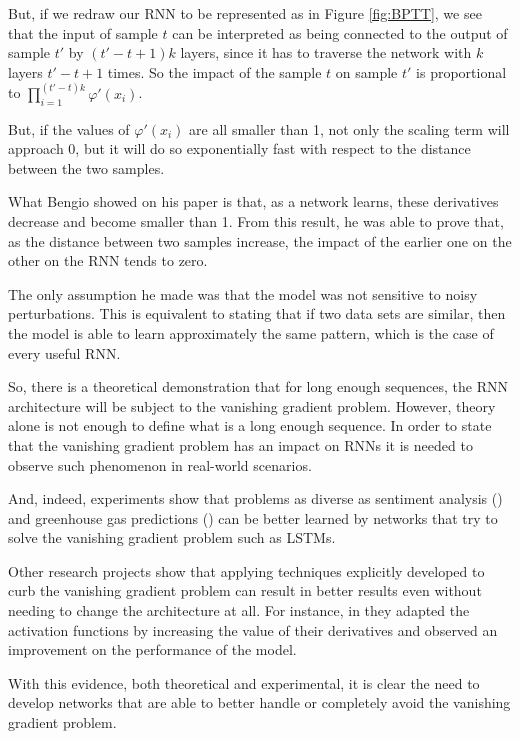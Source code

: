But, if we redraw our RNN to be represented as in Figure \ref{fig:BPTT}, we see that the input of sample $t$ can be interpreted as being connected to the output of sample $t'$ by $(t'-t + 1)k$ layers, since it has to traverse the network with $k$ layers $t'-t+1$ times.
So the impact of the sample $t$ on sample $t'$ is proportional to $\prod_{i=1}^{(t'-t)k}\varphi'(x_i)$.

But, if the values of $\varphi'(x_i)$ are all smaller than 1, not only the scaling term will approach 0, but it will do so exponentially fast with respect to the distance between the two samples.

What Bengio showed on his paper \cite{bengio1993problem} is that, as a network learns, these derivatives decrease and become smaller than 1.
From this result, he was able to prove that, as the distance between two samples increase, the impact of the earlier one on the other on the RNN tends to zero.

The only assumption he made was that the model was not sensitive to noisy perturbations.
This is equivalent to stating that if two data sets are similar, then the model is able to learn approximately the same pattern, which is the case of every useful RNN.

So, there is a theoretical demonstration that for long enough sequences, the RNN architecture will be subject to the vanishing gradient problem.
However, theory alone is not enough to define what is a long enough sequence.
In order to state that the vanishing gradient problem has an impact on RNNs it is needed to observe such phenomenon in real-world scenarios. 

And, indeed, experiments show that problems as diverse as sentiment analysis (\cite{raza2021cloud}) and greenhouse gas predictions (\cite{ludwig2019comparison}) can be better learned by networks that try to solve the vanishing gradient problem such as LSTMs.

Other research projects show that applying techniques explicitly developed to curb the vanishing gradient problem can result in better results even without needing to change the architecture at all.
For instance, in \cite{hu2021handling} they adapted the activation functions by increasing the value of their derivatives and observed an improvement on the performance of the model.

With this evidence, both theoretical and experimental, it is clear the need to develop networks that are able to better handle or completely avoid the vanishing gradient problem.

